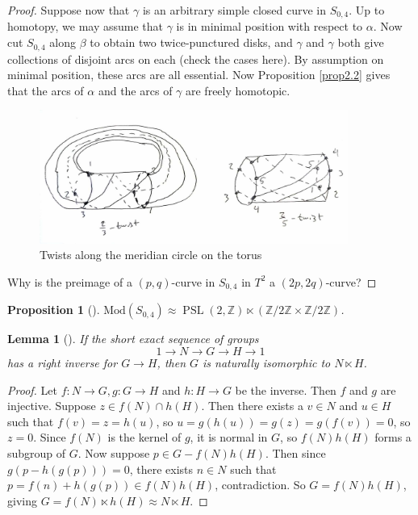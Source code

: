 \documentclass[reqno]{amsart}
\newtheorem{lemma}[theorem]{Lemma}
\newtheorem{proposition}[theorem]{Proposition}
\theoremstyle{definition}
\theoremstyle{remark}
\DeclareMathOperator{\PSL}{PSL}
\newcommand{\Mod}{{\mathrm{Mod}}}
\begin{document}
\begin{proof}
    
    Suppose now that
    $\gamma$ is an arbitrary simple closed curve
    in $S_{0,4}$. Up to homotopy, we may assume that
    $\gamma$ is in minimal position with respect to
    $\alpha$. Now cut $S_{0,4}$ along $\beta$ to
    obtain two twice-punctured disks, and $\gamma$ and
    $\gamma$ both give collections of disjoint
    arcs on each (check the cases here). By
    assumption on minimal position, these arcs
    are all essential. Now
    Proposition \ref{prop2.2} gives that
    the arcs of $\alpha$ and the arcs of $\gamma$ are
    freely homotopic.

    

    \begin{figure}[htpb]
        \centering
        \includegraphics[width=0.9\textwidth]{twists-along-curves-on-torus.jpg}
        \caption{Twists along the meridian circle on the torus}
        \label{fig:twists-along-curves-on-torus-jpg}
    \end{figure}


    Why is the preimage of a $\left( p,q \right) $-curve in
    $S_{0,4}$ in $T^2$ a $\left( 2p,2q \right) $-curve?

\end{proof}

\begin{proposition}[]\label{mcg-of-4-punctured-sphere}
    $\Mod \left( S_{0,4} \right) \approx
    \PSL \left( 2, \mathbb{Z} \right) \ltimes
    \left( \mathbb{Z}/ 2 \mathbb{Z} \times 
    \mathbb{Z} / 2 \mathbb{Z} \right) $.
\end{proposition}


\begin{lemma}[]
    If the short exact sequence of groups
    \[
    1 \to N \to G \to H \to 1
    \] 
    has a right inverse for $G \to H$, then
    $G$ is naturally isomorphic to
    $N \ltimes H$.
\end{lemma}

\begin{proof}
    Let $f \colon N \to G, g \colon G \to H$ and
    $h \colon H \to G$ be the inverse. Then
    $f$ and $g$ are injective. Suppose
    $z \in f(N) \cap h(H)$. Then there exists a
    $v \in N$ and $u \in H$ such that
    $f(v) = z = h(u)$, so 
    $u = g\left( h(u) \right) = g(z)
    = g(f(v)) = 0$, so $z = 0$.
    Since $f(N)$ is the kernel of $g$, it is
    normal in $G$, so $f(N) h(H)$ forms
    a subgroup of $G$. Now suppose
    $p \in G - f(N)h(H)$. Then since
    $g\left( p - h(g(p)) \right) = 0$, there
    exists $n \in N$ such that
    $p = f(n) + h(g(p)) \in f(N) h(H)$, contradiction.
    So $G = f(N) h(H)$, giving $G = f(N) \ltimes h(H)
    \approx N \ltimes H$.
\end{proof}
\end{document}
